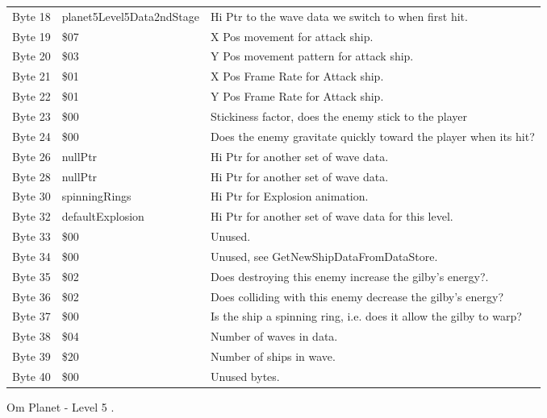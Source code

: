 \begin{figure}[H]
{\begin{adjustbox}{width=12cm}
\begin{tabular}{lll}
 Byte 18 & planet5Level5Data2ndStage & Hi Ptr to the wave data we switch to when first hit.               \\
 Byte 19 & \$07                       & X Pos movement for attack ship.                                    \\
 Byte 20 & \$03                       & Y Pos movement pattern for attack ship.                            \\
 Byte 21 & \$01                       & X Pos Frame Rate for Attack ship.                                  \\
 Byte 22 & \$01                       & Y Pos Frame Rate for Attack ship.                                  \\
 Byte 23 & \$00                       & Stickiness factor, does the enemy stick to the player              \\
 Byte 24 & \$00                       & Does the enemy gravitate quickly toward the player when its hit?   \\
 Byte 26 & nullPtr                   & Hi Ptr for another set of wave data.                               \\
 Byte 28 & nullPtr                   & Hi Ptr for another set of wave data.                               \\
 Byte 30 & spinningRings             & Hi Ptr for Explosion animation.                                    \\
 Byte 32 & defaultExplosion          & Hi Ptr for another set of wave data for this level.                \\
 Byte 33 & \$00                       & Unused.                                                            \\
 Byte 34 & \$00                       & Unused, see GetNewShipDataFromDataStore.                           \\
 Byte 35 & \$02                       & Does destroying this enemy increase the gilby's energy?.           \\
 Byte 36 & \$02                       & Does colliding with this enemy decrease the gilby's energy?        \\
 Byte 37 & \$00                       & Is the ship a spinning ring, i.e. does it allow the gilby to warp? \\
 Byte 38 & \$04                       & Number of waves in data.                                           \\
 Byte 39 & \$20                       & Number of ships in wave.                                           \\
 Byte 40 & \$00                       & Unused bytes.                                                      \\
\bottomrule
\end{tabular}

  \end{adjustbox}

  }\caption*{Om Planet - Level 5
.}
\end{figure}

